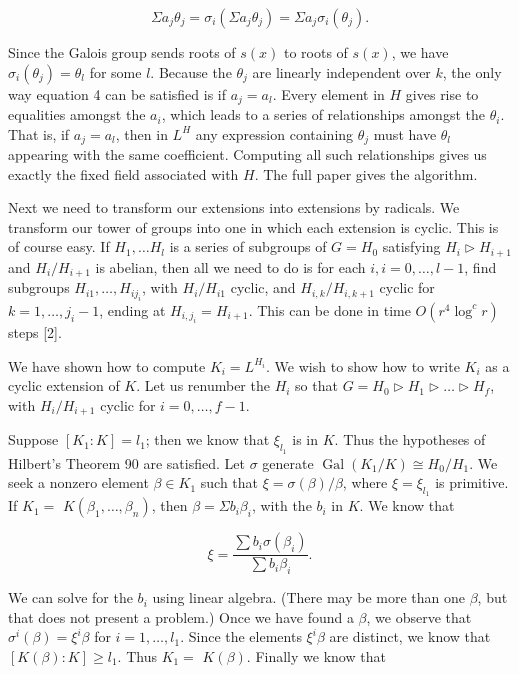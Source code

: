 \documentclass[11pt,letterpaper]{article}
\DeclareMathOperator{\Gal}{Gal}
\begin{document}
\begin{equation*}
\Sigma a_{j} \theta_{j}=\sigma_{i}\left(\Sigma a_{j} \theta_{j}\right)=\Sigma a_{j} \sigma_{i}\left(\theta_{j}\right) . \tag{4}\label{eq:4}
\end{equation*}


Since the Galois group sends roots of $s(x)$ to roots of $s(x)$, we have $\sigma_{i}\left(\theta_{j}\right)=\theta_{l}$ for some $l$. Because the $\theta_{j}$ are linearly independent over $k$, the only way equation 4 can be satisfied is if $a_{j}=a_{l}$. Every element in $H$ gives rise to equalities amongst the $a_{i}$, which leads to a series of relationships amongst the $\theta_{i}$. That is, if $a_{j}=a_{l}$, then in $L^{H}$ any expression containing $\theta_j$ must have $\theta_{l}$ appearing with the same coefficient. Computing all such relationships gives us exactly the fixed field associated with $H$. The full paper gives the algorithm.

Next we need to transform our extensions into extensions by radicals. We transform our tower of groups into one in which each extension is cyclic. This is of course easy. If $H_{1}, \ldots H_{l}$ is a series of subgroups of $G=H_{0}$ satisfying $H_{i} \triangleright H_{i+1}$ and $H_{i} / H_{i+1}$ is abelian, then all we need to do is for each $i, i=0, \ldots, l-1$, find subgroups $H_{i 1}, \ldots, H_{i j_{i}}$, with $H_{i} / H_{i 1}$ cyclic, and $H_{i,k} / H_{i,k+1}$ cyclic for $k=1, \ldots, j_i-1$, ending at $H_{i,j_i}=H_{i+1}$. This can be done in time $O\left(r^{4} \log ^{c} r\right)$ steps [2].

We have shown how to compute $K_{i}=L^{H_{i}}$. We wish to show how to write $K_{i}$ as a cyclic extension of $K$. Let us renumber the $H_{i}$ so that $G=H_{0} \triangleright H_{1} \triangleright \ldots \triangleright H_{f}$, with $H_{i} / H_{i+1}$ cyclic for $i=0, \ldots, f-1$.

Suppose $\left[K_{1}: K\right]=l_{1}$; then we know that $\xi_{l_{1}}$ is in $K$. Thus the hypotheses of Hilbert's Theorem 90 are satisfied. Let $\sigma$ generate $\Gal(K_1/K)\cong H_0/H_1$. We seek a nonzero element $\beta\in K_1$ such that $\xi=\sigma(\beta)/\beta$, where $\xi=\xi_{l_1}$ is primitive. If $K_{1}=$ $K\left(\beta_{1}, \ldots, \beta_{n}\right)$, then $\beta=\Sigma b_{i} \beta_{i}$, with the $b_{i}$ in $K$. We know that

\[
\xi=\frac{\sum b_i\sigma(\beta_i)}{\sum b_i\beta_i} .
\]

We can solve for the $b_{i}$ using linear algebra. (There may be more than one $\beta$, but that does not present a problem.) Once we have found a $\beta$, we observe that $\sigma^{i}(\beta)=\xi^{i} \beta$ for $i=1, \ldots, l_{1}$. Since the elements $\xi^{i} \beta$ are distinct, we know that $[K(\beta): K] \geq l_{1}$. Thus $K_{1}=$ $K(\beta)$. Finally we know that
\end{document}
